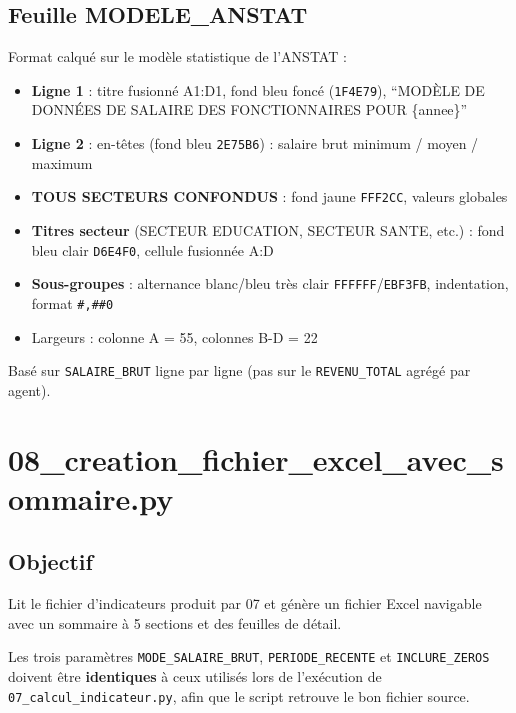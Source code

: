 \documentclass[12pt,a4paper,french]{report}
\begin{document}
\subsection{Feuille MODELE\_ANSTAT}

Format calqué sur le modèle statistique de l'ANSTAT :
\begin{itemize}
  \item \textbf{Ligne 1} : titre fusionné A1:D1, fond bleu foncé
        (\texttt{1F4E79}), ``MODÈLE DE DONNÉES DE SALAIRE DES
        FONCTIONNAIRES POUR \{annee\}''
  \item \textbf{Ligne 2} : en-têtes (fond bleu \texttt{2E75B6}) :
        salaire brut minimum / moyen / maximum
  \item \textbf{TOUS SECTEURS CONFONDUS} : fond jaune \texttt{FFF2CC},
        valeurs globales
  \item \textbf{Titres secteur} (SECTEUR EDUCATION, SECTEUR SANTE, etc.) :
        fond bleu clair \texttt{D6E4F0}, cellule fusionnée A:D
  \item \textbf{Sous-groupes} : alternance blanc/bleu très clair
        \texttt{FFFFFF}/\texttt{EBF3FB}, indentation, format \texttt{\#,\#\#0}
  \item Largeurs : colonne A = 55, colonnes B-D = 22
\end{itemize}

Basé sur \texttt{SALAIRE\_BRUT} ligne par ligne (pas sur le
\texttt{REVENU\_TOTAL} agrégé par agent).

\section{08\_creation\_fichier\_excel\_avec\_sommaire.py}

\subsection{Objectif}

Lit le fichier d'indicateurs produit par 07 et génère un fichier Excel
navigable avec un sommaire à 5 sections et des feuilles de détail.

\begin{warningbox}
  Les trois paramètres \texttt{MODE\_SALAIRE\_BRUT}, \texttt{PERIODE\_RECENTE}
  et \texttt{INCLURE\_ZEROS} doivent être \textbf{identiques} à ceux utilisés
  lors de l'exécution de \texttt{07\_calcul\_indicateur.py}, afin que le script
  retrouve le bon fichier source.
\end{warningbox}
\end{document}
